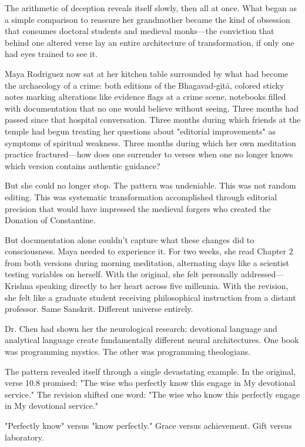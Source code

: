 \documentclass[12pt,twoside]{book}
\begin{document}
\normalfont\justifying
The arithmetic of deception reveals itself slowly, then all at once. What began as a simple comparison to reassure her grandmother became the kind of obsession that consumes doctoral students and medieval monks—the conviction that behind one altered verse lay an entire architecture of transformation, if only one had eyes trained to see it.

Maya Rodriguez now sat at her kitchen table surrounded by what had become the archaeology of a crime: both editions of the Bhagavad-gītā, colored sticky notes marking alterations like evidence flags at a crime scene, notebooks filled with documentation that no one would believe without seeing. Three months had passed since that hospital conversation. Three months during which friends at the temple had begun treating her questions about "editorial improvements" as symptoms of spiritual weakness. Three months during which her own meditation practice fractured—how does one surrender to verses when one no longer knows which version contains authentic guidance?

But she could no longer stop. The pattern was undeniable. This was not random editing. This was systematic transformation accomplished through editorial precision that would have impressed the medieval forgers who created the Donation of Constantine.

But documentation alone couldn't capture what these changes did to consciousness. Maya needed to experience it. For two weeks, she read Chapter 2 from both versions during morning meditation, alternating days like a scientist testing variables on herself. With the original, she felt personally addressed—Krishna speaking directly to her heart across five millennia. With the revision, she felt like a graduate student receiving philosophical instruction from a distant professor. Same Sanskrit. Different universe entirely.

Dr. Chen had shown her the neurological research: devotional language and analytical language create fundamentally different neural architectures. One book was programming mystics. The other was programming theologians.

The pattern revealed itself through a single devastating example. In the original, verse 10.8 promised: "The wise who perfectly know this engage in My devotional service." The revision shifted one word: "The wise who know this perfectly engage in My devotional service."

"Perfectly know" versus "know perfectly." Grace versus achievement. Gift versus laboratory.
\end{document}
